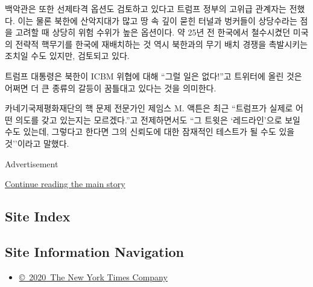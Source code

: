 백악관은 또한 선제타격 옵션도 검토하고 있다고 트럼프 정부의 고위급
관계자는 전했다. 이는 물론 북한에 산악지대가 많고 땅 속 깊이 묻힌 터널과
벙커들이 상당수라는 점을 고려할 때 상당히 위험 수위가 높은 옵션이다. 약
25년 전 한국에서 철수시켰던 미국의 전략적 핵무기를 한국에 재배치하는 것
역시 북한과의 무기 배치 경쟁을 촉발시키는 조치일 수도 있지만, 검토되고
있다.

트럼프 대통령은 북한이 ICBM 위협에 대해 ``그럴 일은 없다!''고 트위터에
올린 것은 어쩌면 더 큰 종류의 갈등이 꿈틀대고 있다는 것을 의미한다.

카네기국제평화재단의 핵 문제 전문가인 제임스 M. 액튼은 최근 ``트럼프가
실제로 어떤 의도를 갖고 있는지는 모르겠다.''고 전제하면서도 ``그 트윗은
`레드라인'으로 보일 수도 있는데, 그렇다고 한다면 그의 신뢰도에 대한
잠재적인 테스트가 될 수도 있을 것''이라고 말했다.

Advertisement

\protect\hyperlink{after-bottom}{Continue reading the main story}

\hypertarget{site-index}{%
\subsection{Site Index}\label{site-index}}

\hypertarget{site-information-navigation}{%
\subsection{Site Information
Navigation}\label{site-information-navigation}}

\begin{itemize}
\tightlist
\item
  \href{https://help.nytimes3xbfgragh.onion/hc/en-us/articles/115014792127-Copyright-notice}{©~2020~The
  New York Times Company}
\end{itemize}

